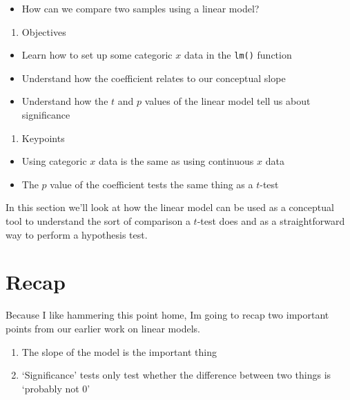 \documentclass[
]{book}
\providecommand{\tightlist}{%
  \setlength{\itemsep}{0pt}\setlength{\parskip}{0pt}}
\begin{document}
\begin{itemize}
\tightlist
\item
  How can we compare two samples using a linear model?
\end{itemize}

\begin{enumerate}
\def\labelenumi{\arabic{enumi}.}
\setcounter{enumi}{1}
\tightlist
\item
  Objectives
\end{enumerate}

\begin{itemize}
\tightlist
\item
  Learn how to set up some categoric \(x\) data in the \texttt{lm()} function
\item
  Understand how the coefficient relates to our conceptual slope
\item
  Understand how the \(t\) and \(p\) values of the linear model tell us about significance
\end{itemize}

\begin{enumerate}
\def\labelenumi{\arabic{enumi}.}
\setcounter{enumi}{2}
\tightlist
\item
  Keypoints
\end{enumerate}

\begin{itemize}
\tightlist
\item
  Using categoric \(x\) data is the same as using continuous \(x\) data
\item
  The \(p\) value of the coefficient tests the same thing as a \(t\)-test
\end{itemize}

In this section we'll look at how the linear model can be used as a conceptual tool to understand the sort of comparison a \(t\)-test does and as a straightforward way to perform a hypothesis test.

\hypertarget{recap}{%
\section{Recap}\label{recap}}

Because I like hammering this point home, Im going to recap two important points from our earlier work on linear models.

\begin{enumerate}
\def\labelenumi{\arabic{enumi}.}
\tightlist
\item
  The slope of the model is the important thing
\item
  `Significance' tests only test whether the difference between two things is `probably not 0'
\end{enumerate}
\end{document}

